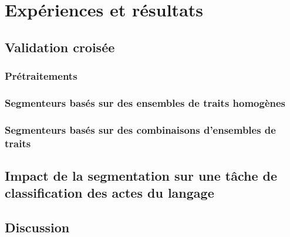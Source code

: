 
\chapter{Expériences et résultats}

\label{ch:experiments_and_results}

\section{Validation croisée}

\lipsum[1]

\subsection{Prétraitements}

\lipsum[1]

\subsection{Segmenteurs basés sur des ensembles de traits homogènes}

\lipsum[1]

\subsection{Segmenteurs basés sur des combinaisons d'ensembles de traits}

\lipsum[1]

\section{Impact de la segmentation sur une tâche de classification des actes du langage}

\lipsum[1]

\section{Discussion}

\lipsum[1]